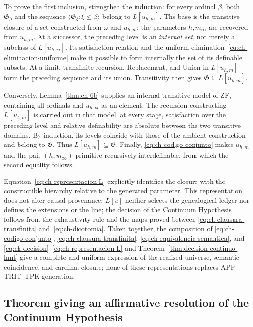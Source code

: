 To prove the first inclusion, strengthen the induction: for every ordinal
\(\beta\), both \(\mathfrak G_\beta\) and the sequence
\(\langle\mathfrak G_\xi:\xi\leq\beta\rangle\) belong to \(L[u_{h,m}]\).
The base is the transitive closure of a set constructed from \(\omega\) and
\(u_{h,m}\); the parameters \(h,m_\infty\) are recovered from \(u_{h,m}\).
At a successor, the preceding level is an \emph{internal set}, not merely a
subclass of \(L[u_{h,m}]\). Its satisfaction relation and the uniform
elimination~\eqref{eq:ch-eliminacion-uniforme} make it possible to form
internally the set of its definable subsets. At a limit, transfinite recursion,
Replacement, and Union in \(L[u_{h,m}]\) form the preceding sequence and its
union. Transitivity then gives \(\mathfrak G\subseteq L[u_{h,m}]\).

Conversely, Lemma~\ref{thm:ch-6b} supplies an internal transitive model of ZF,
containing all ordinals and \(u_{h,m}\) as an element. The recursion
constructing \(L[u_{h,m}]\) is carried out in that model: at every stage,
satisfaction over the preceding level and relative definability are absolute
between the two transitive domains. By induction, its levels coincide with
those of the ambient construction and belong to \(\mathfrak G\). Thus
\(L[u_{h,m}]\subseteq\mathfrak G\). Finally,
\eqref{eq:ch-codigo-conjunto} makes \(u_{h,m}\) and the pair
\((h,m_\infty)\) primitive-recursively interdefinable, from which the second
equality follows.

Equation~\eqref{eq:ch-representacion-L} explicitly identifies the closure with
the constructible hierarchy relative to the generated parameter. This
representation does not alter causal provenance: \(L[u]\) neither selects the
genealogical ledger nor defines the extensions or the line; the decision of
the Continuum Hypothesis follows from the exhaustivity rule and the maps proved
between \eqref{eq:ch-clausura-transfinita} and~\eqref{eq:ch-dicotomia}.
Taken together, the composition of \eqref{eq:ch-codigo-conjunto},
\eqref{eq:ch-clausura-transfinita}, \eqref{eq:ch-equivalencia-semantica}, and
\eqref{eq:ch-decision}--\eqref{eq:ch-representacion-L} and
Theorem~\ref{thm:decision-continuo-hmt} give a complete and uniform
expression of the realized universe, semantic coincidence, and cardinal
closure; none of these representations replaces APP--TRIT--TPK generation.

\subsection{Theorem giving an affirmative resolution of the Continuum Hypothesis}

